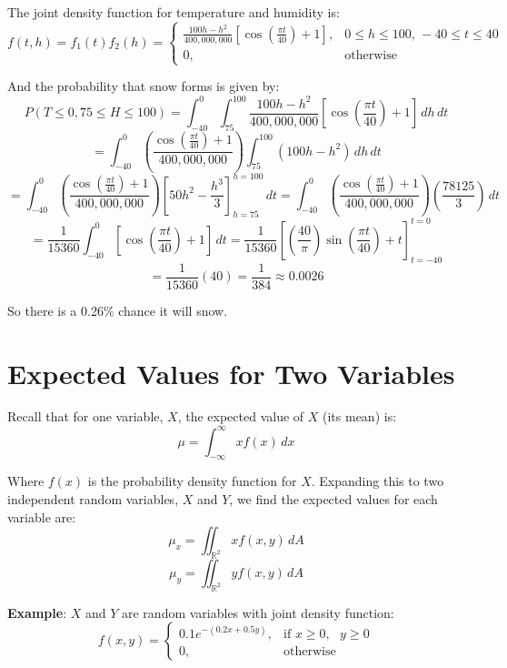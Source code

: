 \begin{Answer}[ref = snow]
The joint density function for temperature and humidity is:
$$f(t, h) = f_1(t)f_2(h) = \begin{cases}
    \frac{100h - h^2}{400,000,000}\left[ \cos{\left( \frac{\pi t}{40} \right)} 
    + 1 \right],& 0 \leq h \leq 100\text{, } -40 \leq t \leq 40\\
    0,&\text{otherwise}
\end{cases}$$

And the probability that snow forms is given by:
$$P(T \leq 0, 75 \leq H \leq 100) = \int_{-40}^{0} \int_{75}^{100} \frac{100h 
- h^2}{400,000,000}\left[ \cos{\left( \frac{\pi t}{40} \right)} + 1 \right]\,dh
\,dt$$
$$= \int_{-40}^0 \left(\frac{\cos{ \left( \frac{\pi t}{40} \right)} + 1}{
400,000,000} \right) \int_{75}^{100} \left(100h - h^2 \right)\,dh\,dt$$
$$= \int_{-40}^0 \left(\frac{\cos{ \left( \frac{\pi t}{40} \right)} + 1}{
400,000,000} \right) \left[ 50h^2 - \frac{h^3}{3} \right]_{h = 75}^{h = 100} 
\,dt= \int_{-40}^0 \left(\frac{\cos{ \left( \frac{\pi t}{40} \right)} + 1}{
400,000,000} \right) \left( \frac{78125}{3} \right)\,dt$$
$$= \frac{1}{15360} \int_{-40}^0 \left[ \cos{ \left( \frac{\pi t}{40} \right)} 
+ 1 \right]\,dt = \frac{1}{15360} \left[ \left( \frac{40}{\pi} \right) \sin{ 
\left( \frac{\pi t}{40} \right)} + t \right]_{t = -40}^{t = 0}$$
$$= \frac{1}{15360} (40) = \frac{1}{384} \approx 0.0026$$

So there is a 0.26\% chance it will snow. 
\end{Answer}

\section{Expected Values for Two Variables}
Recall that for one variable, $X$, the expected value of $X$ (its mean) is:
$$\mu = \int_{- \infty}^{\infty} xf(x)\,dx$$

Where $f(x)$ is the probability density function for $X$. Expanding this to two
independent random variables, $X$ and $Y$, we find the expected values for each
variable are:
$$\mu_x = \iint_{\mathbb{R}^2} xf(x, y)\,dA$$
$$\mu_y = \iint_{\mathbb{R}^2} yf(x, y)\,dA$$

\textbf{Example}: $X$ and $Y$ are random variables with joint density function:
$$f(x, y) = 
\begin{cases}
0.1e^{-(0.2x + 0.5y)},&\text{if } x \geq 0,\text{ }y \geq 0\\
0,&\text{otherwise}
\end{cases}$$

